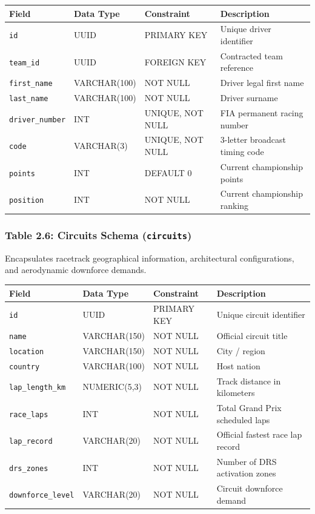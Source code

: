 \documentclass[12pt,a4paper]{report}
\begin{document}
\begin{table}[H]
\centering
\small
\begin{tabularx}{\textwidth}{l p{2.6cm} p{2.6cm} X}
\toprule
\rowcolor{gray!15}
\textbf{Field} & \textbf{Data Type} & \textbf{Constraint} & \textbf{Description} \\
\midrule
\texttt{id} & UUID & PRIMARY KEY & Unique driver identifier \\
\texttt{team\_id} & UUID & FOREIGN KEY & Contracted team reference \\
\texttt{first\_name} & VARCHAR(100) & NOT NULL & Driver legal first name \\
\texttt{last\_name} & VARCHAR(100) & NOT NULL & Driver surname \\
\texttt{driver\_number} & INT & UNIQUE, NOT NULL & FIA permanent racing number \\
\texttt{code} & VARCHAR(3) & UNIQUE, NOT NULL & 3-letter broadcast timing code \\
\texttt{points} & INT & DEFAULT 0 & Current championship points \\
\texttt{position} & INT & NOT NULL & Current championship ranking \\
\bottomrule
\end{tabularx}
\end{table}

\vspace{0.3cm}
\subsubsection*{Table 2.6: Circuits Schema (\textnormal{\texttt{circuits}})}
Encapsulates racetrack geographical information, architectural configurations, and aerodynamic downforce demands.

\begin{table}[H]
\centering
\small
\begin{tabularx}{\textwidth}{l p{2.6cm} p{2.6cm} X}
\toprule
\rowcolor{gray!15}
\textbf{Field} & \textbf{Data Type} & \textbf{Constraint} & \textbf{Description} \\
\midrule
\texttt{id} & UUID & PRIMARY KEY & Unique circuit identifier \\
\texttt{name} & VARCHAR(150) & NOT NULL & Official circuit title \\
\texttt{location} & VARCHAR(150) & NOT NULL & City / region \\
\texttt{country} & VARCHAR(100) & NOT NULL & Host nation \\
\texttt{lap\_length\_km} & NUMERIC(5,3) & NOT NULL & Track distance in kilometers \\
\texttt{race\_laps} & INT & NOT NULL & Total Grand Prix scheduled laps \\
\texttt{lap\_record} & VARCHAR(20) & NOT NULL & Official fastest race lap record \\
\texttt{drs\_zones} & INT & NOT NULL & Number of DRS activation zones \\
\texttt{downforce\_level} & VARCHAR(20) & NOT NULL & Circuit downforce demand \\
\bottomrule
\end{tabularx}
\end{table}
\end{document}
